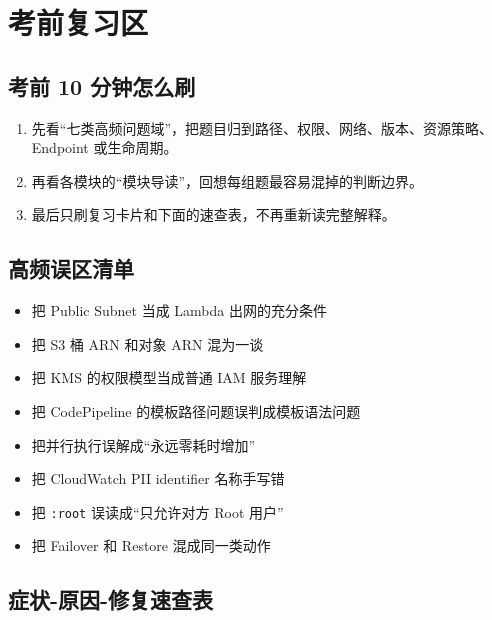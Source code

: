 \documentclass[12pt,a4paper]{article}
\begin{document}
\section{考前复习区}

\subsection{考前 10 分钟怎么刷}

\begin{guidebox}
  \begin{enumerate}
    \item 先看“七类高频问题域”，把题目归到路径、权限、网络、版本、资源策略、Endpoint 或生命周期。
    \item 再看各模块的“模块导读”，回想每组题最容易混掉的判断边界。
    \item 最后只刷复习卡片和下面的速查表，不再重新读完整解释。
  \end{enumerate}
\end{guidebox}

\subsection{高频误区清单}

\begin{pitfallbox}
  \begin{itemize}
    \item 把 Public Subnet 当成 Lambda 出网的充分条件
    \item 把 S3 桶 ARN 和对象 ARN 混为一谈
    \item 把 KMS 的权限模型当成普通 IAM 服务理解
    \item 把 CodePipeline 的模板路径问题误判成模板语法问题
    \item 把并行执行误解成“永远零耗时增加”
    \item 把 CloudWatch PII identifier 名称手写错
    \item 把 \texttt{:root} 误读成“只允许对方 Root 用户”
    \item 把 Failover 和 Restore 混成同一类动作
  \end{itemize}
\end{pitfallbox}

\subsection{症状-原因-修复速查表}
\end{document}
